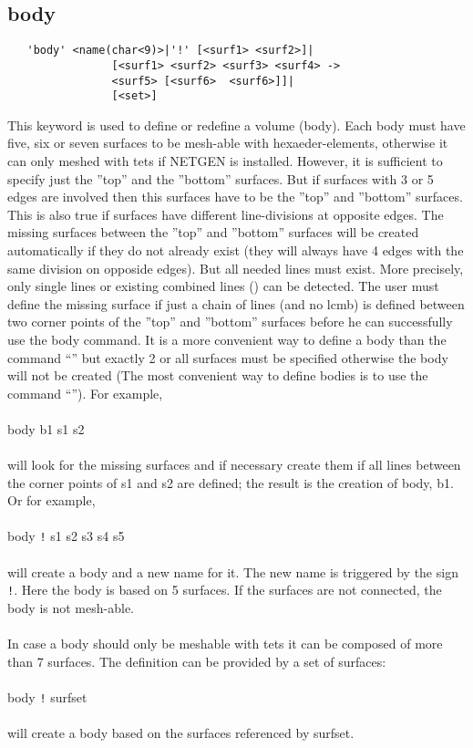 \documentclass{article}
\begin{document}
\subsection{\label{body}body}
\begin{verbatim}
   'body' <name(char<9)>|'!' [<surf1> <surf2>]|
                [<surf1> <surf2> <surf3> <surf4> ->
                <surf5> [<surf6>  <surf6>]]|
                [<set>]
\end{verbatim}
This keyword is used to define or redefine a volume (body). Each body must have five, six or seven surfaces to be mesh-able with hexaeder-elements, otherwise it can only meshed with tets if NETGEN \cite{NETGEN} is installed. However, it is sufficient to specify just the ''top'' and the ''bottom'' surfaces. But if surfaces with 3 or 5 edges are involved then this surfaces have to be the ''top'' and ''bottom'' surfaces. This is also true if surfaces have different line-divisions at opposite edges. The missing surfaces between the ''top'' and ''bottom'' surfaces will be created automatically if they do not already exist (they will always have 4 edges with the same division on opposide edges). But all needed lines must exist. More precisely, only single lines or existing combined lines () can be detected. The user must define the missing surface if just a chain of lines (and no lcmb) is defined between two corner points of the ''top'' and ''bottom'' surfaces before he can successfully use the body command. It is a more convenient way to define a body than the command ``'' but exactly 2 or all surfaces must be specified otherwise the body will not be created (The most convenient way to define bodies is to use the command ``''). 
For example,\\\\body b1 s1 s2\\\\will look for the missing surfaces and if necessary create them if all lines between the corner points of s1 and s2 are defined; the result is the creation of body, b1. Or for example,\\\\body \verb_!_ s1 s2 s3 s4 s5\\\\will create  a body and a new name for it. The new name is triggered by the sign \verb_!_. Here the body is based on 5 surfaces. If the surfaces are not connected, the body is not mesh-able.\\\\In case a body should only be meshable with tets it can be composed of more than 7 surfaces. The definition can be provided by a set of surfaces:\\\\body \verb_!_ surfset\\\\will create  a body based on the surfaces referenced by surfset.
\end{document}
